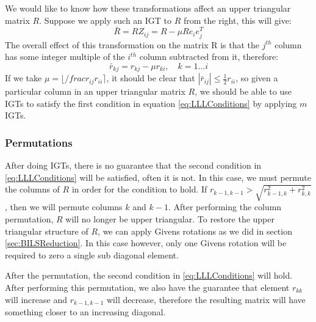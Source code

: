 \documentclass[12pt,Bold,letterpaper]{mcgilletdclass}
\newcommand{\vsp}{\vspace{\baselineskip}}
\begin{document}
We would like to know how these transformations affect an upper triangular matrix $R$. Suppose we apply such an IGT to $R$ from the right, this will give:
\begin{equation}
\bar{R} = RZ_{ij} = R - \mu Re_ie_j^T
\end{equation}
The overall effect of this transformation on the matrix R is that the $j^{th}$ column has some integer multiple of the $i^{th}$ column subtracted from it, therefore:
\begin{equation}
\bar{r}_{kj} = r_{kj} - \mu r_{ki}, \quad k=1 \dots i
\end{equation}
If we take $\mu = \lfloor /frac{r_{ij}}{r_{ii}} \rceil$, it should be clear that $|\bar{r}_{ij}| \le \frac{1}{2}r_{ii}$, so given a particular column in an upper triangular matrix $R$, we should be able to use IGTs to satisfy the first condition in equation \eqref{eq:LLLConditions} by applying $m$ IGTs.

\vsp \subsubsection{Permutations} \label{subsec:Perm}
After doing IGTs, there is no guarantee that the second condition in \eqref{eq:LLLConditions} will be satisfied, often it is not. In this case, we must permute the columns of $R$ in order for the condition to hold. If $r_{k-1,k-1} > \sqrt{r^2_{k-1,k} + r^2_{k,k}}$, then we will permute columns $k$ and $k-1$. After performing the column permutation, $R$ will no longer be upper triangular. To restore the upper triangular structure of $R$, we can apply Givens rotations as we did in section \ref{sec:BILSReduction}. In this case however, only one Givens rotation will be required to zero a single sub diagonal element.

After the permutation, the second condition in \eqref{eq:LLLConditions} will hold. After performing this permutation, we also have the guarantee that element $r_{kk}$ will increase and $r_{k-1,k-1}$ will decrease, therefore the resulting matrix will have something closer to an increasing diagonal.
\end{document}
